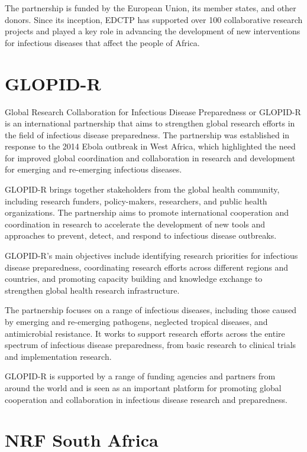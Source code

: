 \documentclass[
]{book}
\begin{document}
The partnership is funded by the European Union, its member states, and other donors. Since its inception, EDCTP has supported over 100 collaborative research projects and played a key role in advancing the development of new interventions for infectious diseases that affect the people of Africa.

\hypertarget{glopidr}{%
\section{GLOPID-R}\label{glopidr}}

Global Research Collaboration for Infectious Disease Preparedness or GLOPID-R is an international partnership that aims to strengthen global research efforts in the field of infectious disease preparedness. The partnership was established in response to the 2014 Ebola outbreak in West Africa, which highlighted the need for improved global coordination and collaboration in research and development for emerging and re-emerging infectious diseases.

GLOPID-R brings together stakeholders from the global health community, including research funders, policy-makers, researchers, and public health organizations. The partnership aims to promote international cooperation and coordination in research to accelerate the development of new tools and approaches to prevent, detect, and respond to infectious disease outbreaks.

GLOPID-R's main objectives include identifying research priorities for infectious disease preparedness, coordinating research efforts across different regions and countries, and promoting capacity building and knowledge exchange to strengthen global health research infrastructure.

The partnership focuses on a range of infectious diseases, including those caused by emerging and re-emerging pathogens, neglected tropical diseases, and antimicrobial resistance. It works to support research efforts across the entire spectrum of infectious disease preparedness, from basic research to clinical trials and implementation research.

GLOPID-R is supported by a range of funding agencies and partners from around the world and is seen as an important platform for promoting global cooperation and collaboration in infectious disease research and preparedness.

\hypertarget{nrfza}{%
\section{NRF South Africa}\label{nrfza}}
\end{document}
